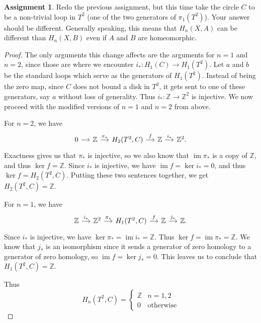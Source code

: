 \documentclass[12pt]{article}
\DeclareMathOperator{\im}{im}
\theoremstyle{definition}
\newtheorem{ex}{Assignment}
\begin{document}
\begin{ex}
	Redo the previous assignment, but this time take the circle $C$ to be a non-trivial loop in $T^2$ (one of the two generators of $\pi_1(T^2)$).
	Your answer should be different.
	Generally speaking, this means that $H_n(X, A)$ can be different than $H_n(X, B)$ even if $A$ and $B$ are homeomorphic.
\end{ex}
\begin{proof}
	The only arguments this change affects are the arguments for $n = 1$ and $n = 2$, since those are where we encounter $i_* : H_1(C) \to H_1(T^2)$.
	Let $a$ and $b$ be the standard loops which serve as the generators of $H_1(T^2)$.
	Instead of being the zero map, since $C$ does not bound a disk in $T^2$, it gets sent to one of these generators, say $a$ without loss of generality.
	Thus $i_* : \mathbb{Z} \to \mathbb{Z}^2$ is injective.
	We now proceed with the modified versions of $n=1$ and $n=2$ from above.

	For $n = 2$, we have \begin{equation*}
		\begin{tikzcd}[column sep=small]
			0 \arrow[r, ""] & \mathbb{Z} \arrow[r, "\pi_*"] & H_2(T^2, C) \arrow[r, "f"] & \mathbb{Z} \arrow[r, "i_*"] & \mathbb{Z}^2.
		\end{tikzcd}
	\end{equation*}
	Exactness gives us that $\pi_*$ is injective, so we also know that $\im \pi_*$ is a copy of $\mathbb{Z}$, and thus $\ker f = \mathbb{Z}$.
	Since $i_*$ is injective, we have $\im f = \ker i_* = 0$, and thus $\ker f = H_2(T^2, C)$.
	Putting these two sentences together, we get $H_2(T^2, C) = \mathbb{Z}$.

	For $n = 1$, we have \begin{equation*}
		\begin{tikzcd}[column sep=small]
			\mathbb{Z} \arrow[r, "i_*"] & \mathbb{Z}^2 \arrow[r, "\pi_*"] & H_1(T^2, C) \arrow[r, "f"] & \mathbb{Z} \arrow[r, "j_*"] & \mathbb{Z}.
		\end{tikzcd}
	\end{equation*}
	Since $i_*$ is injective, we have $\ker\pi_* = \im i_* = \mathbb{Z}$.
	Thus $\ker f = \im\pi_* = \mathbb{Z}$.
	We know that $j_*$ is an isomorphism since it sends a generator of zero homology to a generator of zero homology, so $\im f = \ker j_* = 0$.
	This leaves us to conclude that $H_1(T^2, C) = \mathbb{Z}$.

	Thus \begin{equation*}
		H_n(T^2, C) = \begin{cases}
			\mathbb{Z} & n = 1, 2         \\
			0          & \text{otherwise}
		\end{cases}
	\end{equation*}
\end{proof}
\end{document}
